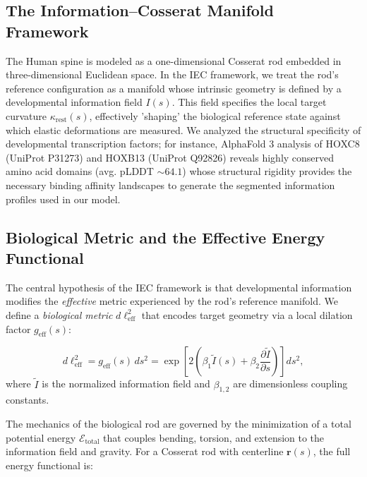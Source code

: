 \documentclass[11pt,a4paper]{article}
\begin{document}
\subsection{The Information--Cosserat Manifold Framework}
The Human spine is modeled as a one-dimensional Cosserat rod embedded in three-dimensional Euclidean space. In the IEC framework, we treat the rod's reference configuration as a manifold whose intrinsic geometry is defined by a developmental information field $I(s)$. This field specifies the local target curvature $\kappa_{\mathrm{rest}}(s)$, effectively 'shaping' the biological reference state against which elastic deformations are measured. We analyzed the structural specificity of developmental transcription factors; for instance, AlphaFold 3 analysis of HOXC8 (UniProt P31273) and HOXB13 (UniProt Q92826) reveals highly conserved amino acid domains (avg. pLDDT $\sim 64.1$) whose structural rigidity provides the necessary binding affinity landscapes to generate the segmented information profiles used in our model.

\subsection{Biological Metric and the Effective Energy Functional}

The central hypothesis of the IEC framework is that developmental information modifies the \emph{effective} metric experienced by the rod's reference manifold. We define a \emph{biological metric} $d\ell_{\mathrm{eff}}^2$ that encodes target geometry via a local dilation factor $g_{\mathrm{eff}}(s)$:

\begin{equation}
d\ell_{\mathrm{eff}}^2 = g_{\mathrm{eff}}(s)\,ds^2 = \exp\left[2\left(\beta_1 \tilde{I}(s) + \beta_2 \frac{\partial \tilde{I}}{\partial s}\right)\right] ds^2,
\label{eq:biological_metric}
\end{equation}
where $\tilde{I}$ is the normalized information field and $\beta_{1,2}$ are dimensionless coupling constants.

The mechanics of the biological rod are governed by the minimization of a total potential energy $\mathcal{E}_{\mathrm{total}}$ that couples bending, torsion, and extension to the information field and gravity. For a Cosserat rod with centerline $\mathbf{r}(s)$, the full energy functional is:
\end{document}

